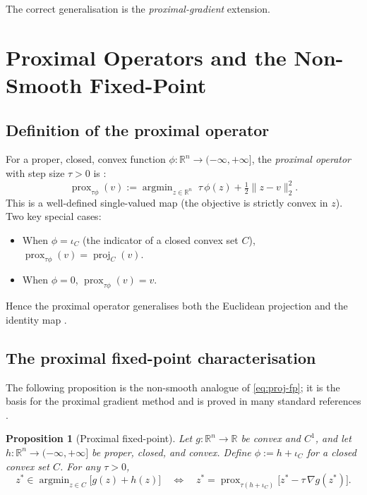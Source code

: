 \documentclass[11pt]{article}
\newcommand{\proj}{\operatorname{proj}}
\newcommand{\prox}{\operatorname{prox}}
\newcommand{\amin}{\mathop{\mathrm{argmin}}}
\newcommand{\R}{\mathbb{R}}
\theoremstyle{plain}
\newtheorem{proposition}{Proposition}
\theoremstyle{remark}
\begin{document}
The correct generalisation is the \emph{proximal-gradient} extension.

\section{Proximal Operators and the Non-Smooth Fixed-Point}
\label{sec:prox}

\subsection{Definition of the proximal operator}

For a proper, closed, convex function $\phi:\R^n\to(-\infty,+\infty]$, the
\emph{proximal operator} with step size $\tau > 0$ is \cite{ParBoy14}:
\begin{equation}\label{eq:prox-def}
  \prox_{\tau\phi}(v)
  := \amin_{z\in\R^n}\;
    \tau\,\phi(z) + \tfrac{1}{2}\|z - v\|_2^2.
\end{equation}
This is a well-defined single-valued map (the objective is strictly convex in
$z$).  Two key special cases:
\begin{itemize}
  \item When $\phi = \iota_C$ (the indicator of a closed convex set $C$),
    $\prox_{\tau\phi}(v) = \proj_C(v)$.
  \item When $\phi = 0$, $\prox_{\tau\phi}(v) = v$.
\end{itemize}
Hence the proximal operator generalises both the Euclidean projection and the
identity map \cite{ParBoy14,RyuBoy16}.

\subsection{The proximal fixed-point characterisation}

The following proposition is the non-smooth analogue of \eqref{eq:proj-fp};
it is the basis for the proximal gradient method \cite{BecTeb09} and is
proved in many standard references \cite{ParBoy14,Bec17}.

\begin{proposition}[Proximal fixed-point]\label{prop:prox-fp}
  Let $g:\R^n\to\R$ be convex and $C^1$, and let $h:\R^n\to(-\infty,+\infty]$
  be proper, closed, and convex.  Define $\phi := h + \iota_C$ for a closed
  convex set $C$.  For any $\tau > 0$,
  \begin{equation}\label{eq:prox-fp}
    z^* \in \amin_{z\in C}\bigl[g(z) + h(z)\bigr]
    \quad\iff\quad
    z^* = \prox_{\tau(h + \iota_C)}\!\bigl[z^* - \tau\,\nabla g(z^*)\bigr].
  \end{equation}
\end{proposition}
\end{document}
